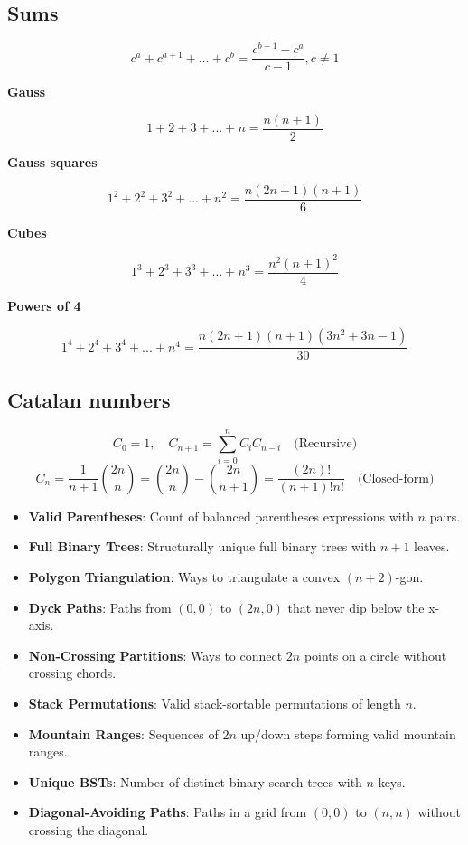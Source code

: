 \documentclass[10pt]{article}
\begin{document}
\begin{multicols*}{2}
\subsection{Sums}

\[
c^a+c^{a+1}+\dots + c^b = \frac{c^{b+1}-c^a}{c-1}, c\neq 1
\]

\textbf{Gauss}

\[
1+2+3+...+n = \frac{n(n+1)}{2}
\]

\textbf{Gauss squares}

\[
1^2+2^2+3^2+...+n^2 = \frac{n(2n+1)(n+1)}{6}
\]

\textbf{Cubes}

\[
1^3+2^3+3^3+...+n^3 = \frac{n^2(n+1)^2}{4}
\]

\textbf{Powers of 4}

\[
1^4+2^4+3^4+...+n^4 = \frac{n(2n+1)(n+1)(3n^2+3n-1)}{30}
\]

\subsection{Catalan numbers}
\[
C_0 = 1, \quad C_{n+1} = \sum_{i=0}^{n} C_i C_{n-i} \quad \text{(Recursive)}
\]
\[
C_n = \frac{1}{n+1} \binom{2n}{n} = \binom{2n}{n} - \binom{2n}{n+1} = \frac{(2n)!}{(n+1)!n!} \quad \text{(Closed-form)}
\]

\begin{itemize}
    \item \textbf{Valid Parentheses}: Count of balanced parentheses expressions with \( n \) pairs.
    \item \textbf{Full Binary Trees}: Structurally unique full binary trees with \( n+1 \) leaves.
    \item \textbf{Polygon Triangulation}: Ways to triangulate a convex \( (n+2) \)-gon.
    \item \textbf{Dyck Paths}: Paths from \( (0,0) \) to \( (2n,0) \) that never dip below the x-axis.
    \item \textbf{Non-Crossing Partitions}: Ways to connect \( 2n \) points on a circle without crossing chords.
    \item \textbf{Stack Permutations}: Valid stack-sortable permutations of length \( n \).
    \item \textbf{Mountain Ranges}: Sequences of \( 2n \) up/down steps forming valid mountain ranges.
    \item \textbf{Unique BSTs}: Number of distinct binary search trees with \( n \) keys.
    \item \textbf{Diagonal-Avoiding Paths}: Paths in a grid from \( (0,0) \) to \( (n,n) \) without crossing the diagonal.
\end{itemize}


\end{multicols*}
\end{document}
